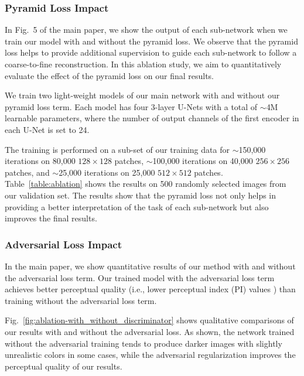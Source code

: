 \documentclass[final]{cvpr}
\begin{document}
\subsubsection{Pyramid Loss Impact} \label{subsubsec:pyramid}

In Fig.\ 5 of the main paper, we show the output of each sub-network when we train our model with and without the pyramid loss. We observe that the pyramid loss helps to provide additional supervision to guide each sub-network to follow a coarse-to-fine reconstruction. In this ablation study, we aim to quantitatively evaluate the effect of the pyramid loss on our final results. 


We train two light-weight models of our main network with and without our pyramid loss term. Each model has four 3-layer U-Nets with a total of $\sim$4M learnable parameters, where the number of output channels of the first encoder in each U-Net is set to 24. 

The training is performed on a sub-set of our training data for $\sim$150,000 iterations on 80,000 $128\!\times\!128$ patches, $\sim$100,000 iterations on 40,000 $256\!\times\!256$ patches, and $\sim$25,000 iterations on 25,000 $512\!\times\!512$ patches. Table\ \ref{table:ablation} shows the results on 500 randomly selected images from our validation set. The results show that the pyramid loss not only helps in providing a better interpretation of the task of each sub-network but also improves the final results.




\subsubsection{Adversarial Loss Impact}

In the main paper, we show quantitative results of our method with and without the adversarial loss term. Our trained model with the adversarial loss term achieves better perceptual quality (i.e., lower perceptual index (PI) values \cite{blau20182018}) than training without the adversarial loss term. 


Fig.\ \ref{fig:ablation-with_without_discriminator} shows qualitative comparisons of our results with and without the adversarial loss. As shown, the network trained without the adversarial training tends to produce darker images with slightly unrealistic colors in some cases, while the adversarial regularization improves the perceptual quality of our results.
\end{document}
